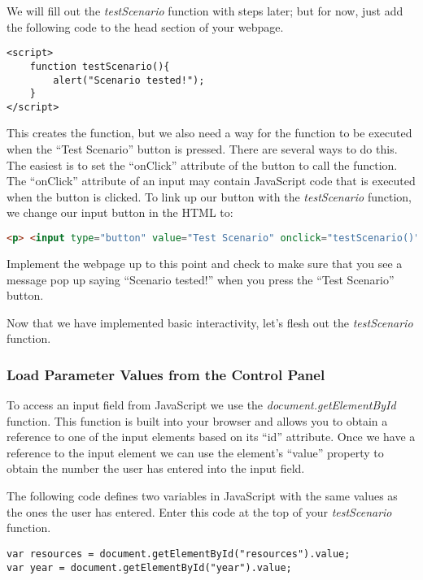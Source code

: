 \documentclass[]{memoir}
\begin{document}
We will fill out the \emph{testScenario} function with steps later; but
for now, just add the following code to the head section of your
webpage.

\begin{lstlisting}
<script>
    function testScenario(){
        alert("Scenario tested!");
    }
</script>
\end{lstlisting}

This creates the function, but we also need a way for the function to be
executed when the ``Test Scenario'' button is pressed. There are several
ways to do this. The easiest is to set the ``onClick'' attribute of the
button to call the function. The ``onClick'' attribute of an input may
contain JavaScript code that is executed when the button is clicked. To
link up our button with the \emph{testScenario} function, we change our
input button in the HTML to:

\begin{lstlisting}[language=HTML]
<p> <input type="button" value="Test Scenario" onclick="testScenario()" /> </p>
\end{lstlisting}

Implement the webpage up to this point and check to make sure that you
see a message pop up saying ``Scenario tested!'' when you press the
``Test Scenario'' button.

Now that we have implemented basic interactivity, let's flesh out the
\emph{testScenario} function.

\subsubsection{Load Parameter Values from the Control Panel}

To access an input field from JavaScript we use the
\emph{document.getElementById} function. This function is built into
your browser and allows you to obtain a reference to one of the input
elements based on its ``id'' attribute. Once we have a reference to the
input element we can use the element's ``value'' property to obtain the
number the user has entered into the input field.

The following code defines two variables in JavaScript with the same
values as the ones the user has entered. Enter this code at the top of
your \emph{testScenario} function.

\begin{lstlisting}
var resources = document.getElementById("resources").value;
var year = document.getElementById("year").value;
\end{lstlisting}
\end{document}
